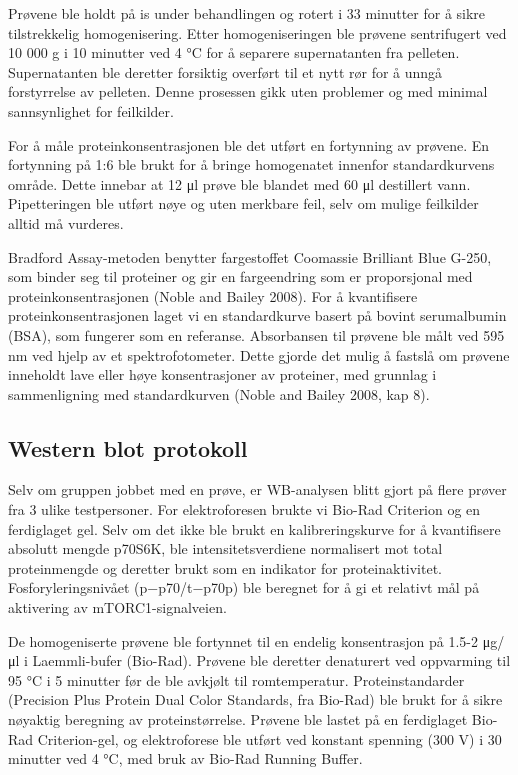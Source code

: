 \documentclass[
  letterpaper,
  DIV=11,
  numbers=noendperiod]{scrreprt}
\begin{document}
Prøvene ble holdt på is under behandlingen og rotert i 33 minutter for å
sikre tilstrekkelig homogenisering. Etter homogeniseringen ble prøvene
sentrifugert ved 10 000 g i 10 minutter ved 4 °C for å separere
supernatanten fra pelleten. Supernatanten ble deretter forsiktig
overført til et nytt rør for å unngå forstyrrelse av pelleten. Denne
prosessen gikk uten problemer og med minimal sannsynlighet for
feilkilder.

For å måle proteinkonsentrasjonen ble det utført en fortynning av
prøvene. En fortynning på 1:6 ble brukt for å bringe homogenatet
innenfor standardkurvens område. Dette innebar at 12 μl prøve ble
blandet med 60 μl destillert vann. Pipetteringen ble utført nøye og uten
merkbare feil, selv om mulige feilkilder alltid må vurderes.

Bradford Assay-metoden benytter fargestoffet Coomassie Brilliant Blue
G-250, som binder seg til proteiner og gir en fargeendring som er
proporsjonal med proteinkonsentrasjonen (Noble and Bailey 2008). For å
kvantifisere proteinkonsentrasjonen laget vi en standardkurve basert på
bovint serumalbumin (BSA), som fungerer som en referanse. Absorbansen
til prøvene ble målt ved 595 nm ved hjelp av et spektrofotometer. Dette
gjorde det mulig å fastslå om prøvene inneholdt lave eller høye
konsentrasjoner av proteiner, med grunnlag i sammenligning med
standardkurven (Noble and Bailey 2008, kap 8).

\subsection{Western blot protokoll}\label{western-blot-protokoll}

Selv om gruppen jobbet med en prøve, er WB-analysen blitt gjort på flere
prøver fra 3 ulike testpersoner. For elektroforesen brukte vi Bio-Rad
Criterion og en ferdiglaget gel. Selv om det ikke ble brukt en
kalibreringskurve for å kvantifisere absolutt mengde p70S6K, ble
intensitetsverdiene normalisert mot total proteinmengde og deretter
brukt som en indikator for proteinaktivitet. Fosforyleringsnivået
(p−p70/t−p70p) ble beregnet for å gi et relativt mål på aktivering av
mTORC1-signalveien.

De homogeniserte prøvene ble fortynnet til en endelig konsentrasjon på
1.5-2 μg/μl i Laemmli-bufer (Bio-Rad). Prøvene ble deretter denaturert
ved oppvarming til 95 °C i 5 minutter før de ble avkjølt til
romtemperatur. Proteinstandarder (Precision Plus Protein Dual Color
Standards, fra Bio-Rad) ble brukt for å sikre nøyaktig beregning av
proteinstørrelse. Prøvene ble lastet på en ferdiglaget Bio-Rad
Criterion-gel, og elektroforese ble utført ved konstant spenning (300 V)
i 30 minutter ved 4 °C, med bruk av Bio-Rad Running Buffer.
\end{document}
